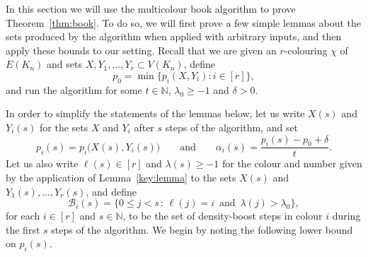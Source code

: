 \documentclass[12pt,reqno]{amsart}
\theoremstyle{definition}
\theoremstyle{remark}
\newcommand\N{\mathbb{N}}
\newcommand\cB{\mathcal{B}}
\renewcommand{\le}{\leqslant}
\renewcommand{\ge}{\geqslant}
\def\N{\mathbb{N}}
\def\cB{\mathcal{B}}
\begin{document}
In this section we will use the multicolour book algorithm to prove Theorem~\ref{thm:book}. To do so, we will first prove a few simple lemmas about the sets produced by the algorithm when applied with arbitrary inputs, and then apply these bounds to our setting. Recall that we are given an \(r\)-colouring \(\chi\) of \(E(K_n)\) and
sets \(X,Y_1,\ldots,Y_r \subset V(K_n)\), define
%
\begin{equation}
	\label{def:p0}
	p_0 = \min\big\{ p_i(X,Y_i) : i \in [r] \big\},
\end{equation}
%
and run the algorithm for some \(t \in \N\), \(\lambda_0 \ge -1\) and \(\delta > 0\).

In order to simplify the statements of the lemmas below, let us write \(X(s)\) and \(Y_i(s)\) for the sets \(X\) and \(Y_i\) after \(s\) steps of the algorithm, and set
%
\begin{equation*}
	p_i(s) = p_i\big( X(s), Y_i(s) \big) \qquad \text{and} \qquad \alpha_i(s) = \frac{p_i(s) - p_0 + \delta}{t}.
\end{equation*}
%
Let us also write \(\ell(s) \in [r]\) and \(\lambda(s) \ge -1\) for the colour and number given by the application of Lemma~\ref{key:lemma} to the sets \(X(s)\) and \(Y_1(s),\dots,Y_r(s)\), and define
%
\begin{equation*}
	\cB_i(s) = \big\{ 0 \le j < s \,:\, \ell(j) = i \, \text{ and } \, \lambda(j) > \lambda_0 \big\},
\end{equation*}
%
for each \(i \in [r]\) and \(s \in \N\), to be the set of density-boost steps in colour \(i\) during the first \(s\) steps of the algorithm. We begin by noting the following lower bound on \(p_i(s)\).
\end{document}
